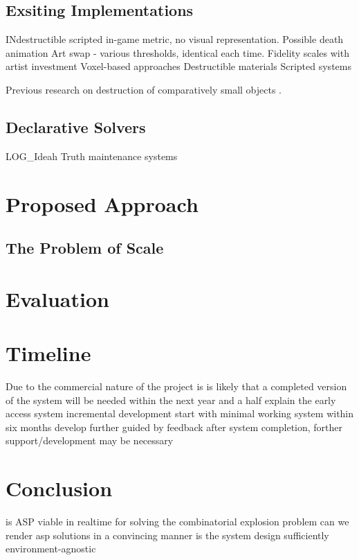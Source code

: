 \documentclass[11pt]{report}
\begin{document}
	\section{Exsiting Implementations}
		INdestructible
		scripted
		in-game metric, no visual representation. Possible death animation
		Art swap - various thresholds, identical each time. Fidelity scales with artist investment
		Voxel-based approaches
		Destructible materials
		Scripted systems

		Previous research on destruction of comparatively small objects \cite{van2011procedural}.
	\section{Declarative Solvers}
		LOG_Ideah
		Truth maintenance systems
\chapter{Proposed Approach}
	\section{The Problem of Scale}
\chapter{Evaluation}
\chapter{Timeline}
	Due to the commercial nature of the project is is likely that a completed version of the system will be needed within the next year and a half
	explain the early access system
	incremental development
	start with minimal working system within six months
	develop further guided by feedback
	after system completion, forther support/development may be necessary

\chapter{Conclusion}
	is ASP viable in realtime for solving the combinatorial explosion problem
	can we render asp solutions in a convincing manner
	is the system design sufficiently environment-agnostic





\end{document}

